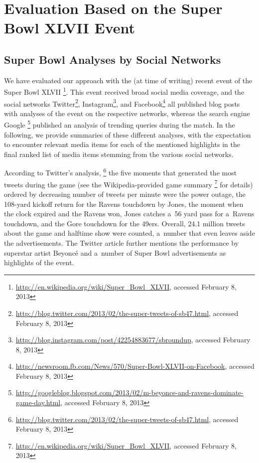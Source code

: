 \section{Evaluation Based on the Super Bowl XLVII Event}
\label{sec-chapter7-evaluation}

\subsection{Super Bowl Analyses by Social Networks}

We have evaluated our approach with the (at time of writing)
recent event of the Super Bowl XLVII%
\footnote{\url{http://en.wikipedia.org/wiki/Super_Bowl_XLVII},
accessed February 8, 2013}.
This event received broad social media coverage, and the social networks
Twitter\footnote{\url{http://blog.twitter.com/2013/02/the-super-tweets-of-sb47.html},
accessed February 8, 2013},
Instagram\footnote{\url{http://blog.instagram.com/post/42254883677/sbroundup},
accessed February 8, 2013}, and
Facebook\footnote{\url{http://newsroom.fb.com/News/570/Super-Bowl-XLVII-on-Facebook},
accessed February 8, 2013} all published blog posts with analyses of the event
on the respective networks,
whereas the search engine Google%
\footnote{\url{http://googleblog.blogspot.com/2013/02/m-beyonce-and-ravens-dominate-game-day.html},
accessed February 8, 2013}
published an analysis of trending queries during the match.
In the following, we provide summaries of these different analyses,
with the expectation to encounter relevant media items
for each of the mentioned highlights in the final ranked list of media items
stemming from the various social networks.

According to Twitter's analysis,%
\footnote{\url{http://blog.twitter.com/2013/02/the-super-tweets-of-sb47.html},
accessed February 8, 2013}
the five moments that generated the most tweets
during the game (see the Wikipedia-provided game summary
\footnote{\url{http://en.wikipedia.org/wiki/Super_Bowl_XLVII},
accessed February 8, 2013} for details)
ordered by decreasing number of tweets per minute were
the power outage,
the 108-yard kickoff return for the Ravens touchdown by Jones,
the moment when the clock expired and the Ravens won,
Jones catches a~56 yard pass for a~Ravens touchdown,
and the Gore touchdown for the 49ers.
Overall, 24.1 million tweets about the game and halftime show were counted,
a~number that even leaves aside the advertisements.
The Twitter article further mentions the performance by superstar artist Beyoncé 
and a~number of Super Bowl advertisements as highlights of the event.   

